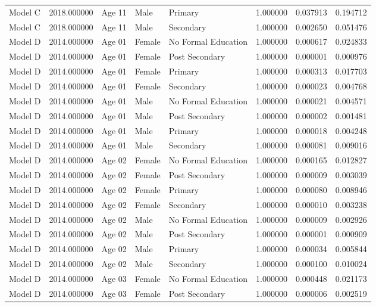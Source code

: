 \begin{table}[ht]
\begin{tabular}{lrlllrrr}
Model C & 2018.000000 & Age 11 & Male & Primary & 1.000000 & 0.037913 & 0.194712 \\
Model C & 2018.000000 & Age 11 & Male & Secondary & 1.000000 & 0.002650 & 0.051476 \\
Model D & 2014.000000 & Age 01 & Female & No Formal Education & 1.000000 & 0.000617 & 0.024833 \\
Model D & 2014.000000 & Age 01 & Female & Post Secondary & 1.000000 & 0.000001 & 0.000976 \\
Model D & 2014.000000 & Age 01 & Female & Primary & 1.000000 & 0.000313 & 0.017703 \\
Model D & 2014.000000 & Age 01 & Female & Secondary & 1.000000 & 0.000023 & 0.004768 \\
Model D & 2014.000000 & Age 01 & Male & No Formal Education & 1.000000 & 0.000021 & 0.004571 \\
Model D & 2014.000000 & Age 01 & Male & Post Secondary & 1.000000 & 0.000002 & 0.001481 \\
Model D & 2014.000000 & Age 01 & Male & Primary & 1.000000 & 0.000018 & 0.004248 \\
Model D & 2014.000000 & Age 01 & Male & Secondary & 1.000000 & 0.000081 & 0.009016 \\
Model D & 2014.000000 & Age 02 & Female & No Formal Education & 1.000000 & 0.000165 & 0.012827 \\
Model D & 2014.000000 & Age 02 & Female & Post Secondary & 1.000000 & 0.000009 & 0.003039 \\
Model D & 2014.000000 & Age 02 & Female & Primary & 1.000000 & 0.000080 & 0.008946 \\
Model D & 2014.000000 & Age 02 & Female & Secondary & 1.000000 & 0.000010 & 0.003238 \\
Model D & 2014.000000 & Age 02 & Male & No Formal Education & 1.000000 & 0.000009 & 0.002926 \\
Model D & 2014.000000 & Age 02 & Male & Post Secondary & 1.000000 & 0.000001 & 0.000909 \\
Model D & 2014.000000 & Age 02 & Male & Primary & 1.000000 & 0.000034 & 0.005844 \\
Model D & 2014.000000 & Age 02 & Male & Secondary & 1.000000 & 0.000100 & 0.010024 \\
Model D & 2014.000000 & Age 03 & Female & No Formal Education & 1.000000 & 0.000448 & 0.021173 \\
Model D & 2014.000000 & Age 03 & Female & Post Secondary & 1.000000 & 0.000006 & 0.002519 \\

\end{tabular}
\end{table}

